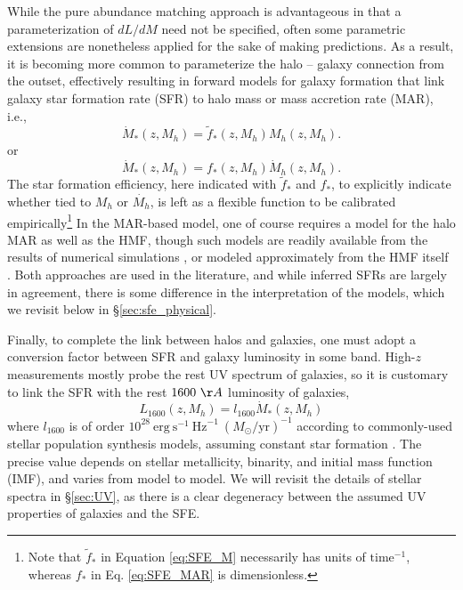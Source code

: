 While the pure abundance matching approach is advantageous in that a parameterization of $dL/dM$ need not be specified, often some parametric extensions are nonetheless applied for the sake of making predictions. As a result, it is becoming more common to parameterize the halo -- galaxy connection from the outset, effectively resulting in forward models for galaxy formation that link galaxy star formation rate (SFR) to halo mass or mass accretion rate (MAR), i.e.,
\begin{equation}
	\dot{M}_{\ast}(z,M_h) = \tilde{f}_{\ast}(z,M_h) M_h (z,M_h) . \label{eq:SFE_M}
\end{equation}
or
\begin{equation}
	\dot{M}_{\ast}(z,M_h) = f_{\ast}(z,M_h) \dot{M}_h (z,M_h) . \label{eq:SFE_MAR}
\end{equation}
The star formation efficiency, here indicated with $\tilde{f}_{\ast}$ and $f_{\ast}$, to explicitly indicate whether tied to $M_h$ or $\dot{M_h}$, is left as a flexible function to be calibrated empirically\footnote{Note that $\tilde{f}_{\ast}$ in Equation \ref{eq:SFE_M} necessarily has units of $\mathrm{time}^{-1}$, whereas $f_{\ast}$ in Eq. \ref{eq:SFE_MAR} is dimensionless.} In the MAR-based model, one of course requires a model for the halo MAR as well as the HMF, though such models are readily available from the results of numerical simulations \cite{McBride2009,Trac2015}, or modeled approximately from the HMF itself \cite{Furlanetto2017}. Both approaches are used in the literature, and while inferred SFRs are largely in agreement, there is some difference in the interpretation of the models, which we revisit below in \S\ref{sec:sfe_physical}.

Finally, to complete the link between halos and galaxies, one must adopt a conversion factor between SFR and galaxy luminosity in some band. High-$z$ measurements mostly probe the rest UV spectrum of galaxies, so it is customary to link the SFR with the rest $1600 \ \AA$ luminosity of galaxies,
\begin{equation}
	L_{1600}(z, M_h) = l_{1600} \dot{M}_{\ast}(z,M_h) \label{eq:L1600}
\end{equation}
where $l_{1600}$ is of order $10^{28} \ \mathrm{erg} \ \mathrm{s}^{-1} \ \mathrm{Hz}^{-1} \ (M_{\odot} / \mathrm{yr})^{-1}$ according to commonly-used stellar population synthesis models, assuming constant star formation \cite{Leitherer1999,Eldridge2009,Conroy2009}. The precise value depends on stellar metallicity, binarity, and initial mass function (IMF), and varies from model to model. We will revisit the details of stellar spectra in \S\ref{sec:UV}, as there is a clear degeneracy between the assumed UV properties of galaxies and the SFE.

